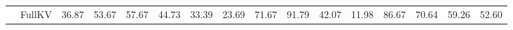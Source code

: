 \begin{table}[t]
{\begin{tabular}{>{\bfseries}c >{\raggedright}p{1.2cm} *{14}{c}}
& FullKV & 36.87 & 53.67 & 57.67 & 44.73 & 33.39 & 23.69 & 71.67 & 91.79 & 42.07 & 11.98 & 86.67 & 70.64 & 59.26 & 52.60 \\

\end{tabular}}
\end{table}
